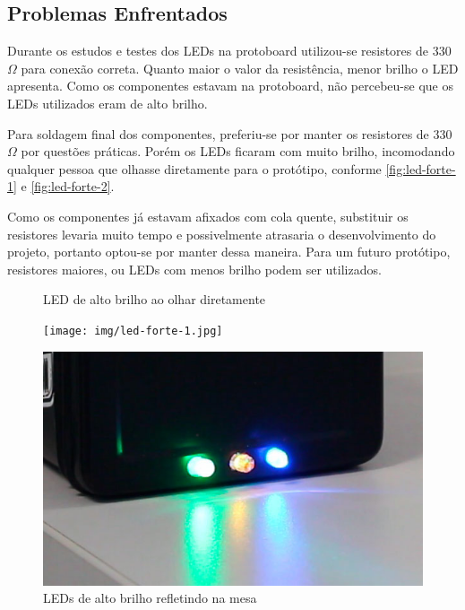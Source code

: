 \subsection{Problemas Enfrentados}\label{sec:problemas-enfrentados}

Durante os estudos e testes dos LEDs na protoboard utilizou-se resistores de 330$\Omega$ para conexão correta. Quanto maior o valor da resistência, menor brilho o LED apresenta. Como os componentes estavam na protoboard, não percebeu-se que os LEDs utilizados eram de alto brilho.

Para soldagem final dos componentes, preferiu-se por manter os resistores de 330$\Omega$ por questões práticas. Porém os LEDs ficaram com muito brilho, incomodando qualquer pessoa que olhasse diretamente para o protótipo, conforme \autoref{fig:led-forte-1} e \autoref{fig:led-forte-2}.

Como os componentes já estavam afixados com cola quente, substituir os resistores levaria muito tempo e possivelmente atrasaria o desenvolvimento do projeto, portanto optou-se por manter dessa maneira. Para um futuro protótipo, resistores maiores, ou LEDs com menos brilho podem ser utilizados.

\begin{figure}[htb]
	\centering
 	\begin{minipage}{0.45\textwidth}
		\centering
		\caption{\label{fig:led-forte-1}LED de alto brilho ao olhar diretamente}
		\texttt{[image: img/led-forte-1.jpg]}
	\end{minipage}
	\hfill
	\begin{minipage}{0.45\textwidth}
		\centering
		\caption{\label{fig:led-forte-2}LEDs de alto brilho refletindo na mesa}
		\includegraphics[width=1\textwidth]{img/led-forte-2.jpg}
	\end{minipage}
\end{figure}

